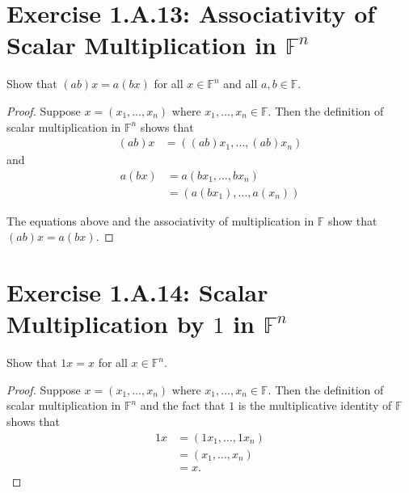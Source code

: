 \section{Exercise 1.A.13: Associativity of Scalar Multiplication in $\mathbb{F}^n$}
Show that $(ab)x=a(bx)$ for all $x\in\mathbb{F}^n$ and all $a,b\in\mathbb{F}$.
\begin{proof}
Suppose $x=(x_1,\dots,x_n)$ where $x_1,\dots,x_n\in\mathbb{F}$. Then the definition of scalar multiplication in $\mathbb{F}^n$ shows that
\begin{equation*}
\begin{split}
(ab)x&=((ab)x_1,\dots,(ab)x_n)
\end{split}
\end{equation*}
and
\begin{equation*}
\begin{split}
a(bx)&=a(bx_1,\dots,bx_n)\\
&=(a(bx_1),\dots,a(x_n))
\end{split}
\end{equation*}

The equations above and the associativity of multiplication in $\mathbb{F}$ show that $(ab)x=a(bx)$.
\end{proof}

\section{Exercise 1.A.14: Scalar Multiplication by $1$ in $\mathbb{F}^n$}
Show that $1x=x$ for all $x\in\mathbb{F}^n$.
\begin{proof}
Suppose $x=(x_1,\dots,x_n)$ where $x_1,\dots,x_n\in\mathbb{F}$. Then the definition of scalar multiplication in $\mathbb{F}^n$ and the fact that $1$ is the multiplicative identity of $\mathbb{F}$ shows that
\begin{equation*}
\begin{split}
1x&=(1x_1,\dots,1x_n)\\
&=(x_1,\dots,x_n)\\
&=x.
\end{split}
\end{equation*}
\end{proof}

